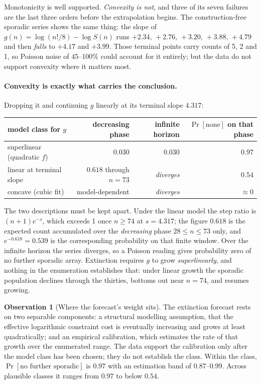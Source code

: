 \documentclass[11pt,a4paper,oneside]{report}
\theoremstyle{definition}
\newtheorem{observation}[theorem]{Observation}
\begin{document}
Monotonicity is well supported. \emph{Convexity is not}, and three of its seven
failures are the last three orders before the extrapolation begins. The
construction-free sporadic series shows the same thing: the slope of
$g(n)=\log(n!/8)-\log S(n)$ runs $+2.34,\,+2.76,\,+3.20,\,+3.88,\,+4.79$ and then
\emph{falls} to $+4.17$ and $+3.99$. Those terminal points carry counts of 5, 2
and 1, so Poisson noise of 45--100\% could account for it entirely; but the data
do not support convexity where it matters most.

\paragraph{Convexity is exactly what carries the conclusion.} Dropping it and
continuing $g$ linearly at its terminal slope $4.317$:

\begin{center}
\begin{tabular}{@{}lrrr@{}}
\toprule
model class for $g$ & decreasing phase & infinite horizon & $\Pr[\text{none}]$ on that phase \\
\midrule
superlinear (quadratic $f$) & $0.030$ & $0.030$ & $0.97$ \\
linear at terminal slope & $0.618$ through $n=73$ & \emph{diverges} & $0.54$ \\
concave (cubic fit) & model-dependent & \emph{diverges} & $\approx0$ \\
\bottomrule
\end{tabular}
\end{center}

\noindent The two descriptions must be kept apart. Under the linear model the
step ratio is $(n+1)e^{-s}$, which exceeds 1 once $n\ge74$ at $s=4.317$; the
figure $0.618$ is the expected count accumulated over the \emph{decreasing} phase
$28\le n\le73$ only, and $e^{-0.618}=0.539$ is the corresponding probability on
that finite window. Over the infinite horizon the series diverges, so a Poisson
reading gives probability zero of no further sporadic array. Extinction requires
$g$ to grow \emph{superlinearly}, and nothing in the enumeration establishes that:
under linear growth the sporadic population declines through
the thirties, bottoms out near $n=74$, and resumes growing.

\begin{observation}[Where the forecast's weight sits]
\label{p6-obs:weight}
The extinction forecast rests on two separable components: a structural
modelling assumption, that the effective logarithmic constraint cost is
eventually increasing and grows at least quadratically; and an empirical
calibration, which estimates the rate of that growth over the enumerated range.
The data support the calibration only after the model class has been chosen; they
do not establish the class. Within the class, $\Pr[\text{no further sporadic}]$ is
$0.97$ with an estimation band of $0.87$--$0.99$. Across plausible classes it
ranges from $0.97$ to below $0.54$.
\end{observation}
\end{document}
